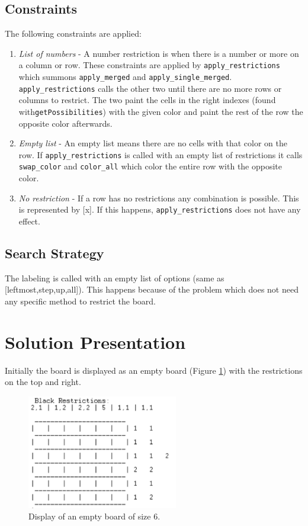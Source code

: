 \documentclass[runningheads,a4paper]{llncs}
\begin{document}
\subsection{Constraints}

	The following constraints are applied:

	\begin{enumerate}
	\item \emph{List of numbers}
		- A number restriction is when there is a number or more on a column or row. These constraints are applied by \verb|apply_restrictions| which summons \verb|apply_merged| and \verb|apply_single_merged|. \verb|apply_restrictions| calls the other two until there are no more rows or columns to restrict. The two paint the cells in the right indexes (found with\verb|getPossibilities|) with the given color and paint the rest of the row the opposite color afterwards. 
	\item \emph{Empty list}
		- An empty list means there are no cells with that color on the row. If \verb|apply_restrictions| is called with an empty list of restrictions it calls \verb|swap_color| and \verb|color_all| which color the entire row with the opposite color.
	\item \emph{No restriction}
		- If a row has no restrictions any combination is possible. This is represented by [x]. If this happens, \verb|apply_restrictions| does not have any effect.
	\end{enumerate}

\subsection{Search Strategy}

	The labeling is called with an empty list of options (same as [leftmost,step,up,all]). This happens because of the problem which does not need any specific method to restrict the board.

\section{Solution Presentation}

	Initially the board is displayed as an empty board (Figure \ref{empty}) with the restrictions on the top and right. 

	\begin{figure}[h]
	\centering
	\includegraphics[height=5cm]{empty.png}
	\caption{Display of an empty board of size 6.}
	\label{empty}
	\end{figure}
\end{document}
